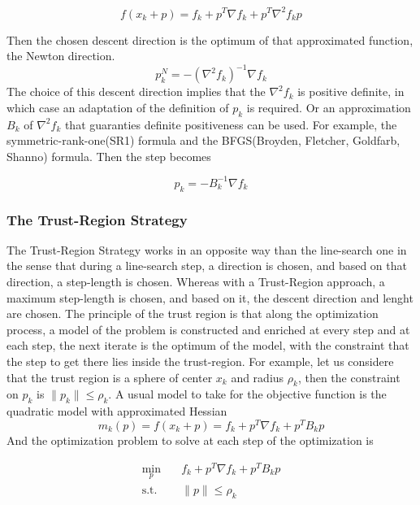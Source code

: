\begin{equation}
  f(x_k+p) = f_k + p^T\nabla f_k + p^T\nabla^2f_k p
\end{equation}

Then the chosen descent direction is the optimum of that approximated function,
the Newton direction.
\begin{equation}
  p^N_k = -(\nabla^2 f_k)^{-1} \nabla f_k
\end{equation}
The choice of this descent direction implies that the $\nabla^2f_k$ is positive
definite, in which case an adaptation of the definition of $p_k$ is required. Or
an approximation $B_k$ of $\nabla^2f_k$ that guaranties definite positiveness can be
used. For example, the symmetric-rank-one(SR1) formula and the BFGS(Broyden,
Fletcher, Goldfarb, Shanno) formula. Then the step becomes 

\begin{equation}
  p_k = -B_k^{-1}\nabla f_k
\end{equation}

\subsubsection{The Trust-Region Strategy}
The Trust-Region Strategy works in an opposite way than the line-search one in
the sense that during a line-search step, a direction is chosen, and based on
that direction, a step-length is chosen. Whereas with a Trust-Region approach, a
maximum step-length is chosen, and based on it, the descent direction and lenght
are chosen.
The principle of the trust region is that along the optimization process, a
model of the problem is constructed and enriched at every step and at each step,
the next iterate is the optimum of the model, with the constraint that the step
to get there lies inside the trust-region. For example, let us considere that
the trust region is a sphere of center $x_k$ and radius $\rho_k$, then the
constraint on $p_k$ is $\|p_k\| \leq \rho_k$. A usual model to take for the
objective function is the quadratic model with approximated Hessian
\begin{equation}
  m_k(p) = f(x_k+p) = f_k + p^T\nabla f_k + p^TB_k p
\end{equation}
And the optimization problem to solve at each step of the optimization is

\begin{align}
  \min_{p} & \quad f_k + p^T\nabla f_k + p^TB_k p \nonumber\\
\text{s.t.}&
\quad \|p\| \leq \rho_k
\label{eq:trustRegion}
\end{align}

